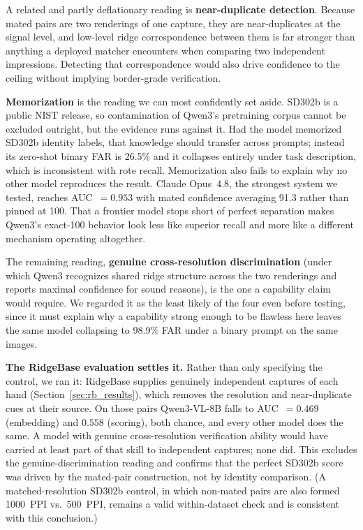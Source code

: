 \documentclass[journal]{IEEEtran}
\begin{document}
A related and partly deflationary reading is \textbf{near-duplicate
detection}. Because mated pairs are two renderings of one capture, they are
near-duplicates at the signal level, and low-level ridge correspondence
between them is far stronger than anything a deployed matcher encounters
when comparing two independent impressions. Detecting that correspondence
would also drive confidence to the ceiling without implying border-grade
verification.

\textbf{Memorization} is the reading we can most confidently set aside.
SD302b is a public NIST release, so contamination of Qwen3's pretraining
corpus cannot be excluded outright, but the evidence runs against it. Had
the model memorized SD302b identity labels, that knowledge should transfer
across prompts; instead its zero-shot binary FAR is 26.5\% and it collapses
entirely under task description, which is inconsistent with rote recall.
Memorization also fails to explain why no other model reproduces the
result. Claude Opus~4.8, the strongest system we tested, reaches
AUC~$= 0.953$ with mated confidence averaging 91.3 rather than pinned
at 100. That a frontier model stops short of perfect separation makes
Qwen3's exact-100 behavior look less like superior recall and more like a
different mechanism operating altogether.

The remaining reading, \textbf{genuine cross-resolution discrimination} (under
which Qwen3 recognizes shared ridge structure across the two renderings and
reports maximal confidence for sound reasons), is the one a capability claim
would require. We regarded it as the least likely of the four even before
testing, since it must explain why a capability strong enough to be flawless
here leaves the same model collapsing to 98.9\% FAR under a binary prompt on
the same images.

\textbf{The RidgeBase evaluation settles it.} Rather than only specifying the
control, we ran it: RidgeBase supplies genuinely independent captures of each
hand (Section~\ref{sec:rb_results}), which removes the resolution and
near-duplicate cues at their source. On those pairs Qwen3-VL-8B falls to
AUC~$= 0.469$ (embedding) and $0.558$ (scoring), both chance, and every other
model does the same. A model with genuine cross-resolution verification
ability would have carried at least part of that skill to independent
captures; none did. This excludes the genuine-discrimination reading and
confirms that the perfect SD302b score was driven by the mated-pair
construction, not by identity comparison. (A matched-resolution SD302b control,
in which non-mated pairs are also formed 1000~PPI vs.\ 500~PPI, remains a
valid within-dataset check and is consistent with this conclusion.)
\end{document}
